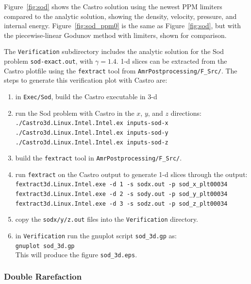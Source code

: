 Figure~\ref{fig:sod} shows the Castro solution using the newest PPM limiters
compared to the analytic 
solution, showing the density, velocity, pressure, and internal energy.
Figure~\ref{fig:sod_ppm0} is the same as Figure~\ref{fig:sod},
but with the piecewise-linear Godunov method with limiters, 
shown for comparison.

The {\tt Verification} subdirectory includes the analytic solution for
the Sod problem {\tt sod-exact.out}, with $\gamma = 1.4$.  1-d slices
can be extracted from the Castro plotfile using the {\tt fextract} tool
from {\tt AmrPostprocessing/F\_Src/}.  
The steps to generate this verification plot with Castro are:
\begin{enumerate}
\item in {\tt Exec/Sod}, build the Castro executable in 3-d
\item run the Sod problem with Castro in the $x$, $y$, and $z$ directions: \\
 {\tt ./Castro3d.Linux.Intel.Intel.ex inputs-sod-x} \\
 {\tt ./Castro3d.Linux.Intel.Intel.ex inputs-sod-y} \\
 {\tt ./Castro3d.Linux.Intel.Intel.ex inputs-sod-z}
\item build the {\tt fextract} tool in {\tt AmrPostprocessing/F\_Src/}.  
\item run {\tt fextract} on the Castro output to generate 1-d slices
 through the output: \\
 {\tt fextract3d.Linux.Intel.exe -d 1 -s sodx.out -p sod\_x\_plt00034} \\
 {\tt fextract3d.Linux.Intel.exe -d 2 -s sody.out -p sod\_y\_plt00034} \\
 {\tt fextract3d.Linux.Intel.exe -d 3 -s sodz.out -p sod\_z\_plt00034}
\item copy the {\tt sodx/y/z.out} files into the {\tt Verification} directory.
\item in {\tt Verification} run the gnuplot script {\tt sod\_3d.gp} as: \\
 {\tt gnuplot sod\_3d.gp} \\
 This will produce the figure {\tt sod\_3d.eps}.
\end{enumerate}

\subsubsection{Double Rarefaction}

